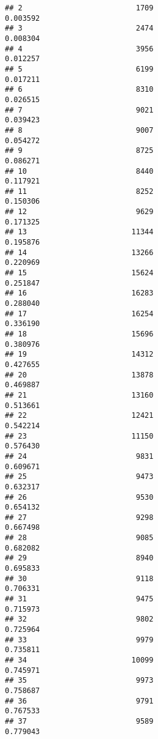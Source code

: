 \documentclass[
]{article}
\begin{document}
\begin{verbatim}
## 2                          1709                               0.003592
## 3                          2474                               0.008304
## 4                          3956                               0.012257
## 5                          6199                               0.017211
## 6                          8310                               0.026515
## 7                          9021                               0.039423
## 8                          9007                               0.054272
## 9                          8725                               0.086271
## 10                         8440                               0.117921
## 11                         8252                               0.150306
## 12                         9629                               0.171325
## 13                        11344                               0.195876
## 14                        13266                               0.220969
## 15                        15624                               0.251847
## 16                        16283                               0.288040
## 17                        16254                               0.336190
## 18                        15696                               0.380976
## 19                        14312                               0.427655
## 20                        13878                               0.469887
## 21                        13160                               0.513661
## 22                        12421                               0.542214
## 23                        11150                               0.576430
## 24                         9831                               0.609671
## 25                         9473                               0.632317
## 26                         9530                               0.654132
## 27                         9298                               0.667498
## 28                         9085                               0.682082
## 29                         8940                               0.695833
## 30                         9118                               0.706331
## 31                         9475                               0.715973
## 32                         9802                               0.725964
## 33                         9979                               0.735811
## 34                        10099                               0.745971
## 35                         9973                               0.758687
## 36                         9791                               0.767533
## 37                         9589                               0.779043

\end{verbatim}
\end{document}
